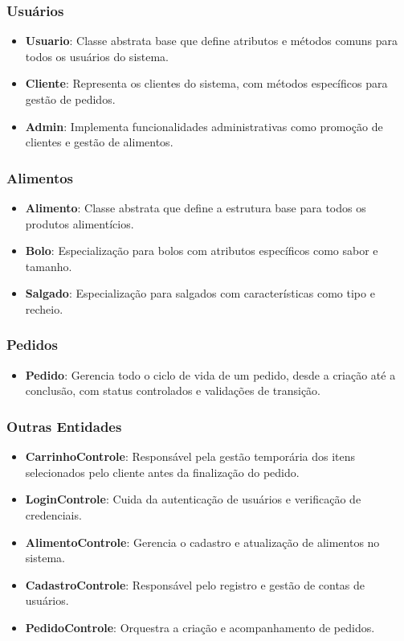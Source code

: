 \documentclass[conference]{IEEEtran}
\begin{document}
\subsubsection{Usuários}
\begin{itemize}
    \item \textbf{Usuario}: Classe abstrata base que define atributos e métodos comuns para todos os usuários do sistema.
    \item \textbf{Cliente}: Representa os clientes do sistema, com métodos específicos para gestão de pedidos.
    \item \textbf{Admin}: Implementa funcionalidades administrativas como promoção de clientes e gestão de alimentos.
\end{itemize}

\subsubsection{Alimentos}
\begin{itemize}
    \item \textbf{Alimento}: Classe abstrata que define a estrutura base para todos os produtos alimentícios.
    \item \textbf{Bolo}: Especialização para bolos com atributos específicos como sabor e tamanho.
    \item \textbf{Salgado}: Especialização para salgados com características como tipo e recheio.
\end{itemize}

\subsubsection{Pedidos}
\begin{itemize}
    \item \textbf{Pedido}: Gerencia todo o ciclo de vida de um pedido, desde a criação até a conclusão, com status controlados e validações de transição.
\end{itemize}

\subsubsection{Outras Entidades}
\begin{itemize}
    \item \textbf{CarrinhoControle}: Responsável pela gestão temporária dos itens selecionados pelo cliente antes da finalização do pedido.
    
    \item \textbf{LoginControle}: Cuida da autenticação de usuários e verificação de credenciais.
    
    \item \textbf{AlimentoControle}: Gerencia o cadastro e atualização de alimentos no sistema.
    
    \item \textbf{CadastroControle}: Responsável pelo registro e gestão de contas de usuários.
    
    \item \textbf{PedidoControle}: Orquestra a criação e acompanhamento de pedidos.
\end{itemize}
\end{document}
